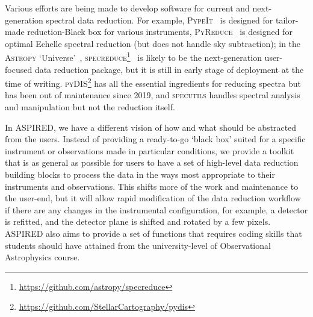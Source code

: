 \documentclass[linenumbers, twocolumn]{aastex631}
\begin{document}
Various efforts are being made to develop software for current and
next-generation  spectral data reduction. For example,
\textsc{PypeIt}~\citep{pypeit:zenodo, 2020JOSS....5.2308P} is designed for
tailor-made reduction-Black box for various instruments,
\textsc{PyReduce}~\citep{2021A&A...646A..32P} is designed for optimal Echelle
spectral reduction (but does not handle sky subtraction); in the \textsc{Astropy}
`Universe'~\citep{astropy:2013, astropy:2018},
\textsc{specreduce}\footnote{\url{https://github.com/astropy/specreduce}}~\citep{pickering_timothy_2022_7007991} is likely to be the
next-generation user-focused data reduction package, but it is still in early
stage of deployment at the time of writing.
\textsc{pyDIS}\footnote{\url{https://github.com/StellarCartography/pydis}} has
all the essential ingredients for reducing spectra but has been out of
maintenance since 2019, and \textsc{specutils}
handles spectral analysis and manipulation but not the reduction itself.

In \textsc{ASPIRED}, we have a different vision of how and what should be
abstracted from the users. Instead of providing a ready-to-go `black box'
suited for a specific instrument or observations made in particular conditions,
we provide a toolkit that is as general as possible for users to have a set of
high-level data reduction building blocks to process the data in the ways most
appropriate to their instruments and observations. This shifts more of the work
and maintenance to the user-end, but it will allow rapid modification of the
data reduction workflow if there are any changes in the instrumental
configuration, for example, a detector is refitted, and the detector plane is
shifted and rotated by a few pixels. \textsc{ASPIRED} also aims to provide a
set of functions that requires coding skills that students should have attained
from the university-level of Observational Astrophysics course.
\end{document}

